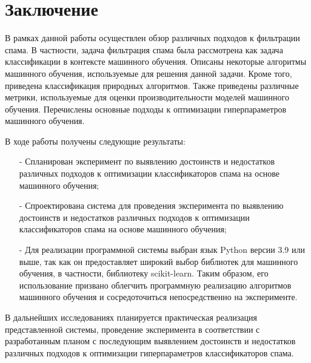 \chapter*{Заключение}

В рамках данной работы осуществлен обзор различных подходов к фильтрации 
спама. В частности, задача фильтрация спама была рассмотрена как задача 
классификации в контексте машинного обучения. Описаны некоторые алгоритмы 
машинного обучения, используемые для решения данной задачи. Кроме того, 
приведена классификация природных алгоритмов.
Также приведены различные метрики, используемые для оценки производительности 
моделей машинного обучения. Перечислены основные подходы к оптимизации гиперпараметров 
машинного обучения.

В ходе работы получены следующие результаты:
\begin{enumerate}

\item[-] Спланирован эксперимент по выявлению достоинств и недостатков различных 
подходов к оптимизации классификаторов спама на основе машинного обучения;

\item[-] Спроектирована система для проведения эксперимента по выявлению достоинств и 
недостатков различных подходов к оптимизации классификаторов спама на основе машинного 
обучения;

\item[-] Для реализации программной системы выбран язык Python версии 3.9 или выше, 
так как он предоставляет широкий выбор библиотек для машинного обучения, в частности, 
библиотеку scikit-learn. Таким образом, его использование призвано облегчить программную 
реализацию алгоритмов машинного обучения и сосредоточиться непосредственно на 
эксперименте.
\end{enumerate}

В дальнейших исследованиях планируется практическая реализация представленной системы,  
проведение эксперимента в соответствии с разработанным планом с последующим 
выявлением достоинств и недостатков различных подходов к оптимизации гиперпараметров 
классификаторов спама.